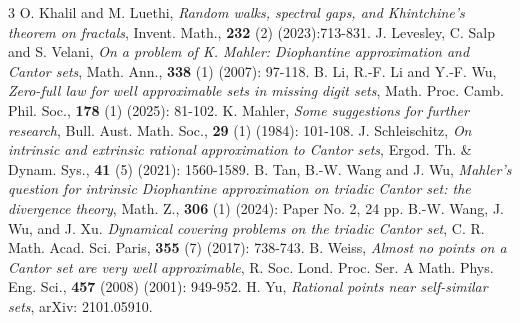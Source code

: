 \documentclass[12pt]{article}
\theoremstyle{definition}
\theoremstyle{remark}
\renewcommand{\emph}[1]{{\it#1}}
\begin{document}
\begin{thebibliography}{3}
 O. Khalil and M. Luethi, \emph{Random walks, spectral gaps, and Khintchine's theorem on fractals},
Invent. Math., \textbf{232} (2) (2023):713-831.
 J. Levesley, C. Salp and S. Velani, \emph{On a problem of K. Mahler: Diophantine approximation and Cantor sets}, Math. Ann., \textbf{338} (1) (2007): 97-118.
 B. Li, R.-F. Li and Y.-F. Wu, \emph{Zero-full law for well approximable sets in missing digit sets}, Math. Proc. Camb. Phil. Soc., \textbf{178} (1) (2025): 81-102.
 K. Mahler, \emph{Some suggestions for further research}, Bull. Aust. Math. Soc., \textbf{29} (1) (1984): 101-108.
 J. Schleischitz, \emph{On intrinsic and extrinsic rational approximation to Cantor sets}, Ergod. Th. \& Dynam. Sys.,
\textbf{41} (5) (2021): 1560-1589.
 B. Tan, B.-W. Wang and J. Wu, \emph{Mahler's question for intrinsic Diophantine approximation on triadic Cantor set: the divergence theory}, Math. Z., \textbf{306} (1) (2024): Paper No. 2, 24 pp.
 B.-W. Wang, J. Wu, and J. Xu. \emph{Dynamical covering problems on the triadic Cantor set},  C. R. Math. Acad. Sci. Paris, \textbf{355} (7) (2017): 738-743.
 B. Weiss, \emph{Almost no points on a Cantor set are very well approximable}, R. Soc. Lond. Proc. Ser. A Math. Phys. Eng. Sci., \textbf{457} (2008) (2001): 949-952.
 H. Yu, \emph{Rational points near self-similar sets}, arXiv: 2101.05910.
\end{thebibliography}
\end{document}
